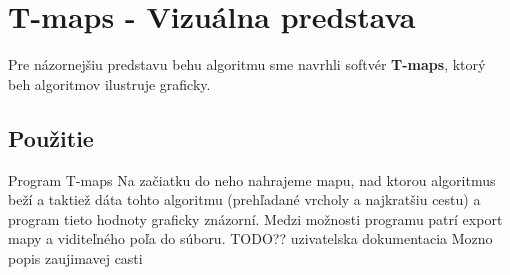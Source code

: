 \chapter{T-maps - Vizuálna predstava}

Pre názornejšiu predstavu behu algoritmu sme navrhli softvér \textbf{T-maps}, ktorý beh algoritmov ilustruje graficky.

\section{Použitie}

Program T-maps  Na začiatku do neho nahrajeme mapu, nad ktorou algoritmus beží a taktiež dáta
tohto algoritmu (prehľadané vrcholy a najkratšiu cestu) a program tieto hodnoty graficky znázorní.
Medzi možnosti programu patrí export mapy a viditeľného poľa do súboru.
 TODO??  uzivatelska dokumentacia
Mozno popis zaujimavej casti  

